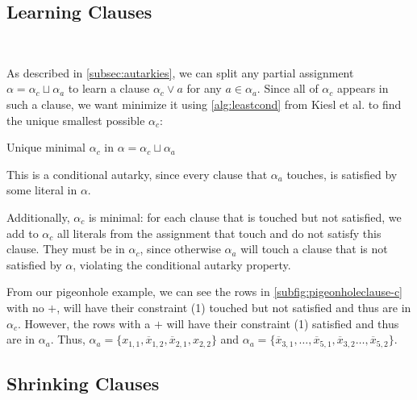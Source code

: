 \subsection{Learning Clauses}~\label{subsec:learning}


As described in \autoref{subsec:autarkies}, we can split any partial assignment
$\alpha = \alpha_c \sqcup \alpha_a$ to learn a \pr clause $\alpha_c \lor a$ for
any $a \in \alpha_a$. Since all of $\alpha_c$ appears in such a clause, we want
minimize it using \autoref{alg:leastcond} from Kiesl et al.
\cite{conditionalautarkies} to find the unique smallest possible $\alpha_c$:


\begin{algorithm}
    \caption{Unique minimal $\alpha_c$ in $\alpha = \alpha_c \sqcup \alpha_a$}\label{alg:leastcond}
    \SetAlgoNoLine

\end{algorithm}

This is a conditional autarky, since every clause that $\alpha_a$ touches, is
satisfied by some literal in $\alpha$.

Additionally, $\alpha_c$ is minimal: for each clause that is touched but not
satisfied, we add to $\alpha_c$ all literals from the assignment that touch and do
not satisfy this clause. They must be in $\alpha_c$, since otherwise $\alpha_a$
will touch a clause that is not satisfied by $\alpha$, violating the conditional
autarky property.

From our pigeonhole example, we can see the rows in
\autoref{subfig:pigeonholeclause-c} with no $+$, will have their constraint (1)
touched but not satisfied and thus are in $\alpha_c$. However, the rows with a
$+$ will have their constraint (1) satisfied and thus are in $\alpha_a$. Thus,
$\alpha_a = \{x_{1, 1}, \overline{x}_{1, 2}, \overline{x}_{2, 1}, x_{2, 2}\}$
and $\alpha_a = \{\overline{x}_{3, 1}, \ldots, \overline{x}_{5, 1}, \overline{x}_{3,
2} \ldots, \overline{x}_{5, 2}\}$.

\subsection{Shrinking Clauses}~\label{subsec:shrinking}

